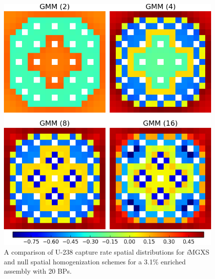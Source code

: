 \begin{figure}[h!]
\centering
\includegraphics[width=0.9\linewidth]{figures/results/compare/assm-31-20BPs/compare-capt}
\vspace{2mm}
\caption[U-238 capture rate comparison for a 3.1\% enriched assembly with 20 BPs]{A comparison of U-238 capture rate spatial distributions for \textit{i}\ac{MGXS} and null spatial homogenization schemes for a 3.1\% enriched assembly with 20 \acp{BP}.}
\label{fig:chap11-assm-31-20BPs-capt-rates}
\end{figure}
	
\clearpage


